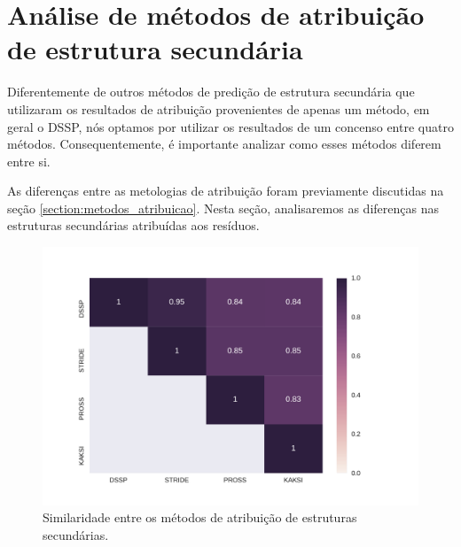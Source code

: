 \section{Análise de métodos de atribuição de estrutura secundária}

Diferentemente de outros métodos de predição de estrutura secundária que utilizaram os resultados de atribuição provenientes de apenas um método, em geral o DSSP, nós optamos por utilizar os resultados de um concenso entre quatro métodos. Consequentemente, é importante analizar como esses métodos diferem entre si.

As diferenças entre as metologias de atribuição foram previamente discutidas na seção \ref{section:metodos_atribuicao}. Nesta seção, analisaremos as diferenças nas estruturas secundárias atribuídas aos resíduos.



\begin{figure}
  \includegraphics[width=\linewidth]{../figures/comparacao_metodos_atribuicao.pdf}
  \caption{Similaridade entre os métodos de atribuição de estruturas secundárias.}
  \label{fig:comparacao_metodos_atribuicao}
\end{figure}